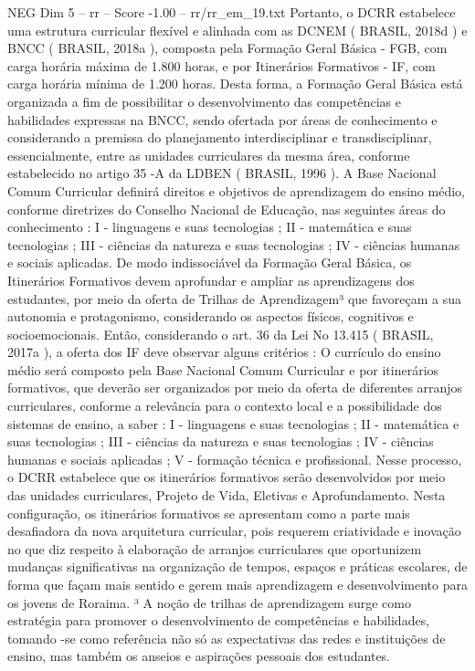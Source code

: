 \begin{textsample}{NEG Dim 5 – rr – Score -1.00 – rr/rr\_em\_19.txt}
Portanto, o DCRR estabelece uma estrutura curricular flexível e alinhada com as DCNEM ( BRASIL, 2018d ) e BNCC ( BRASIL, 2018a ), composta pela Formação Geral Básica - FGB, com carga horária máxima de 1.800 horas, e por Itinerários Formativos - IF, com carga horária mínima de 1.200 horas.
Desta forma, a Formação Geral Básica está organizada a fim de possibilitar o desenvolvimento das competências e habilidades expressas na BNCC, sendo ofertada por áreas de conhecimento e considerando a premissa do planejamento interdisciplinar e transdisciplinar, essencialmente, entre as unidades curriculares da mesma área, conforme estabelecido no artigo 35 -A da LDBEN ( BRASIL, 1996 ).
A Base Nacional Comum Curricular definirá direitos e objetivos de aprendizagem do ensino médio, conforme diretrizes do Conselho Nacional de Educação, nas seguintes áreas do conhecimento : I - linguagens e suas tecnologias ; II - matemática e suas tecnologias ; III - ciências da natureza e suas tecnologias ; IV - ciências humanas e sociais aplicadas.
De modo indissociável da Formação Geral Básica, os Itinerários Formativos devem aprofundar e ampliar as aprendizagens dos estudantes, por meio da oferta de Trilhas de Aprendizagem³ que favoreçam a sua autonomia e protagonismo, considerando os aspectos físicos, cognitivos e socioemocionais.
Então, considerando o art. 36 da Lei No 13.415 ( BRASIL, 2017a ), a oferta dos IF deve observar alguns critérios : O currículo do ensino médio será composto pela Base Nacional Comum Curricular e por itinerários formativos, que deverão ser organizados por meio da oferta de diferentes arranjos curriculares, conforme a relevância para o contexto local e a possibilidade dos sistemas de ensino, a saber : I - linguagens e suas tecnologias ; II - matemática e suas tecnologias ; III - ciências da natureza e suas tecnologias ; IV - ciências humanas e sociais aplicadas ; V - formação técnica e profissional.
Nesse processo, o DCRR estabelece que os itinerários formativos serão desenvolvidos por meio das unidades curriculares, Projeto de Vida, Eletivas e Aprofundamento.
Nesta configuração, os itinerários formativos se apresentam como a parte mais desafiadora da nova arquitetura curricular, pois requerem criatividade e inovação no que diz respeito à elaboração de arranjos curriculares que oportunizem mudanças significativas na organização de tempos, espaços e práticas escolares, de forma que façam mais sentido e gerem mais aprendizagem e desenvolvimento para os jovens de Roraima. ³ A noção de trilhas de aprendizagem surge como estratégia para promover o desenvolvimento de competências e habilidades, tomando -se como referência não só as expectativas das redes e instituições de ensino, mas também os anseios e aspirações pessoais dos estudantes.

\end{textsample}
